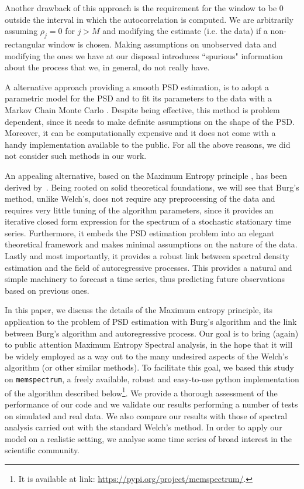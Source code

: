 \documentclass{aa}
\begin{document}
Another drawback of this approach is the requirement for the window to be $0$ outside the interval in which the autocorrelation is computed.
We are arbitrarily assuming $\rho_j = 0$ for $j > M$ and modifying the estimate (i.e. the data) if a non-rectangular window is chosen.
Making assumptions on unobserved data and modifying the ones we have at our disposal introduces ``spurious" information about the process that we, in general, do not really have.

A alternative approach providing a smooth PSD estimation, is to adopt a parametric model for the PSD and to fit its parameters to the data with a Markov Chain Monte Carlo \citep[e.g.]{Cornish_2015, Littenberg_2015}. Despite being effective, this method is problem dependent, since it needs to make definite assumptions on the shape of the PSD. Moreover, it can be computationally expensive and it does not come with a handy implementation available to the public. For all the above reasons, we did not consider such methods in our work.

An appealing alternative, based on the Maximum Entropy principle \citep{JaynesArticle,jaynes2003ptl, Jaynes_MAXENT}, has been derived by~\citet{burg1975maximum}. Being rooted on solid theoretical foundations, we will see that Burg's method, unlike Welch's, does not require any preprocessing of the data and requires very little tuning of the algorithm parameters, since it provides an iterative closed form expression for the spectrum of a stochastic stationary time series. Furthermore, it embeds the PSD estimation problem into an elegant theoretical framework and makes minimal assumptions on the nature of the data.
Lastly and most importantly, it provides a robust link between spectral density estimation and the field of autoregressive processes. This provides a natural and simple machinery to forecast a time series, thus predicting future observations based on previous ones.

In this paper, we discuss the details of the Maximum entropy principle, its application to the problem of PSD estimation with Burg's algorithm and the link between Burg's algorithm and autoregressive process.
Our goal is to bring (again) to public attention Maximum Entropy Spectral analysis, in the hope that it will be widely employed as a way out to the many undesired aspects of the Welch's algorithm (or other similar methods).
To facilitate this goal, we based this study on \texttt{memspectrum}, a freely available, robust and easy-to-use python implementation of the algorithm described below\footnote{
It is available at link: \url{https://pypi.org/project/memspectrum/}.}.
We provide a thorough assessment of the performance of our code and we validate our results performing a number of tests on simulated and real data.
We also compare our results with those of spectral analysis carried out with the standard Welch's method.
In order to apply our model on a realistic setting, we analyse some time series of broad interest in the scientific community.
\end{document}
